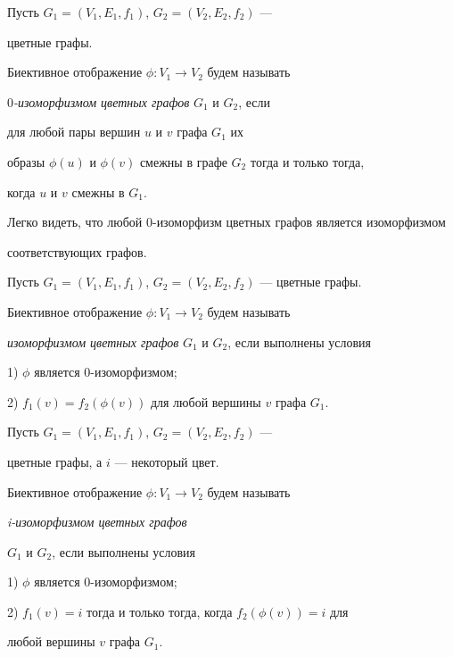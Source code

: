 \begin{defns}


Пусть $G_1=(V_1, E_1, f_1)$, $G_2=(V_2, E_2, f_2)$ ---


цветные графы.


Биективное отображение $\phi:V_1\to V_2$ будем называть


{\it $0$-изоморфизмом цветных графов} $G_1$ и $G_2$, если


для любой пары вершин $u$ и $v$ графа $G_1$ их


образы $\phi(u)$ и $\phi(v)$ смежны в графе $G_2$ тогда и только тогда,


когда $u$ и $v$ смежны в $G_1$.


\end{defns}





Легко видеть, что любой 0-изоморфизм цветных графов является изоморфизмом


соответствующих графов.





\begin{defns}


Пусть $G_1=(V_1, E_1, f_1)$, $G_2=(V_2, E_2, f_2)$ --- цветные графы.


Биективное отображение $\phi:V_1\to V_2$ будем называть


{\it изоморфизмом цветных графов} $G_1$ и $G_2$, если выполнены условия





1) $\phi$ является 0-изоморфизмом;





2) $f_1(v)=f_2(\phi(v))$ для любой вершины $v$ графа $G_1$.


\end{defns}





\begin{defns}


Пусть $G_1=(V_1, E_1, f_1)$, $G_2=(V_2, E_2, f_2)$ ---


цветные графы, а $i$ --- некоторый цвет.


Биективное отображение $\phi:V_1\to V_2$ будем называть


{\it i-изоморфизмом цветных графов}


$G_1$ и $G_2$, если выполнены условия





1) $\phi$ является 0-изоморфизмом;





2) $f_1(v)=i$ тогда и только тогда, когда $f_2(\phi(v))=i$ для


любой вершины $v$ графа $G_1$.


\end{defns}





